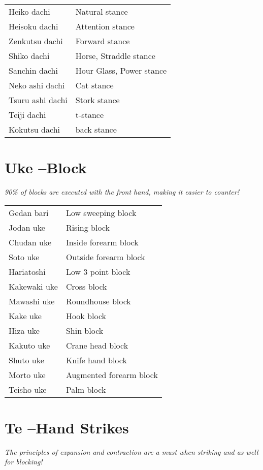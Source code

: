 \documentclass[11pt]{article}
\begin{document}
\begin{center}
\begin{tabular}{ll}
Heiko     dachi & Natural stance\\
Heisoku   dachi & Attention stance\\
Zenkutsu  dachi & Forward stance\\
Shiko     dachi & Horse, Straddle stance\\
Sanchin   dachi & Hour Glass, Power   stance\\
Neko ashi dachi & Cat stance\\
Tsuru ashi dachi & Stork stance\\
Teiji dachi & t-stance\\
Kokutsu dachi & back stance\\
\end{tabular}
\end{center}
\section{Uke --Block}
\label{sec:orgad6aae4}
\begin{center}
\emph{90\% of blocks are executed with the front hand, making it easier to counter!}
\end{center}

\begin{center}
\begin{tabular}{ll}
Gedan bari & Low sweeping block\\
Jodan uke & Rising block\\
Chudan uke & Inside forearm block\\
Soto uke & Outside forearm block\\
Hariatoshi & Low 3 point block\\
Kakewaki uke & Cross block\\
Mawashi uke & Roundhouse block\\
Kake uke & Hook block\\
Hiza uke & Shin block\\
Kakuto uke & Crane head block\\
Shuto uke & Knife hand block\\
Morto uke & Augmented forearm block\\
Teisho uke & Palm block\\
\end{tabular}
\end{center}

\newpage
\section{Te --Hand Strikes}
\label{sec:orgde7aef0}
\begin{center}
\vspace{-1em}
\emph{The principles of expansion and contraction are a must when striking and as well for blocking!}
\end{center}
\end{document}
